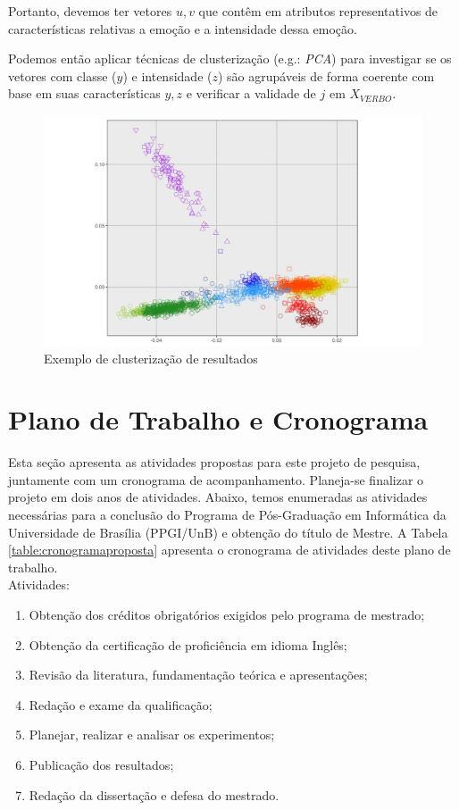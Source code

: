 Portanto, devemos ter vetores $u,v$ que contêm em atributos representativos de características relativas a emoção e a intensidade dessa emoção.

Podemos então aplicar técnicas de clusterização (e.g.: \textit{PCA}) para investigar se os vetores com classe ($y$) e intensidade ($z$) são agrupáveis de forma coerente com base em suas características $y, z$ e verificar a validade de $j$ em $X_{VERBO}$.

\begin{figure}[!h]
\centering
\includegraphics[width=1.0\textwidth]{imagens/p-naosupervisionado.png}
\caption{\label{fig:clusterizacaoresults}Exemplo de clusterização de resultados}
\end{figure}

\clearpage
\section{Plano de Trabalho e Cronograma}

Esta seção apresenta as atividades propostas para este projeto de pesquisa, juntamente com um cronograma de acompanhamento. Planeja-se finalizar o projeto em dois anos de atividades. Abaixo, temos enumeradas as atividades necessárias para a conclusão do Programa de Pós-Graduação em Informática da Universidade de Brasília (PPGI/UnB) e obtenção do título de Mestre. A Tabela \ref{table:cronogramaproposta} apresenta o cronograma de atividades deste plano de trabalho.\\

Atividades:

\begin{enumerate}
    \item Obtenção dos créditos obrigatórios exigidos pelo programa de mestrado;
    \item Obtenção da certificação de proficiência em idioma Inglês;
    \item Revisão da literatura, fundamentação teórica e apresentações;
    \item Redação e exame da qualificação;
    \item Planejar, realizar e analisar os experimentos;
    \item Publicação dos resultados;
    \item Redação da dissertação e defesa do mestrado.
\end{enumerate}

